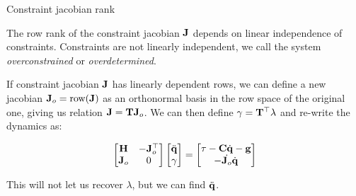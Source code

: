 \documentclass{beamer}
\begin{document}
\begin{frame}{Constraint jacobian rank}
	\begin{flushleft}
		
		The row rank of the constraint jacobian $\mathbf{J}$ depends on linear independence of constraints. Constraints are not linearly independent, we call the system \emph{overconstrained} or \emph{overdetermined}.
		
		\bigskip
		
		If constraint jacobian $\mathbf{J}$ has linearly dependent rows, we can define a new jacobian $\mathbf{J}_o = \text{row}(\mathbf{J})$ as an orthonormal basis in the row space of the original one, giving us relation $\mathbf{J} = \mathbf{T} \mathbf{J}_o$. We can then define $\gamma = \mathbf{T}^\top \lambda$ and re-write the dynamics as:
		
		\begin{equation}
			\begin{bmatrix}
				\mathbf{H} & -\mathbf{J}_o^\top \\
				\mathbf{J}_o & 0
			\end{bmatrix}
			\begin{bmatrix}
				\ddot{\mathbf{q}} \\
				\gamma
			\end{bmatrix}
			=
			\begin{bmatrix}
				\tau - \mathbf{C} \dot{\mathbf{q}} - \mathbf{g} \\
				-\dot{\mathbf{J}_o} \dot{\mathbf{q}}
			\end{bmatrix}
		\end{equation}
		
		This will not let us recover $\lambda$, but we can find $\ddot{\mathbf{q}}$.
		
	\end{flushleft}
\end{frame}






\myqrframe
\end{document}
